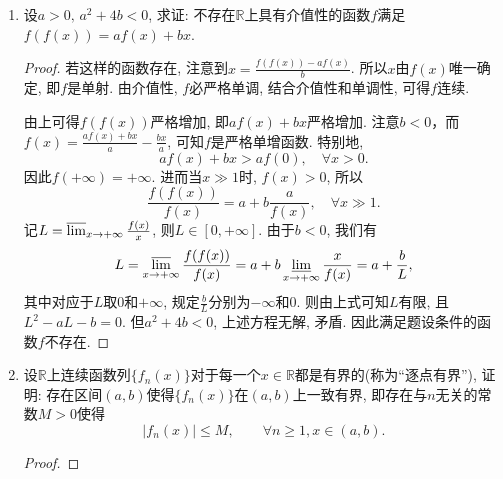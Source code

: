 \begin{3b}
\begin{enumerate}
\begin{proof}
类似地，可以找到 $k_2>k_1,[a_2, b_2] \subset[a_1, b_1]$，
满足 $0<b_2-a_2 \leqslant \frac{2}{k_2}$，使得
$$|f(x)| \geqslant \varepsilon, \quad \forall\, x \in[k_2a_2, k_2b_2].$$
一般地，依次有 $k_n>k_{n-1},[a_k, b_k] \subset[a_{k-1}, b_{k-1}]\ (n=3,4, \cdots)$，
满足 $0<b_k-a_k \leqslant \frac{2}{k_n}$，使得
$$|f(x)| \geqslant \varepsilon, \quad \forall\, x \in[k_na_n, k_nb_n].$$
由闭区间套定理，区间列 $\{[a_n, b_n]\}$ 有唯一的公共点 $\xi>0$。
因 $k_n\xi \in[k_na_n, k_nb_n]$，所以
$$|f(k_n\xi)| \geqslant \varepsilon, \quad \forall\, n \geqslant 1,$$
这与 $\lim\limits_{n \rightarrow+\infty} f(n\xi)=0$ 矛盾。
所以 $\lim\limits_{x \rightarrow+\infty} f(x)=0$。

注：从证明过程易见只要对某个区间 $(a, b) \subset(0,+\infty)$ 成立
$$\lim_{n \rightarrow+\infty} f(nx)=0, \quad \forall\, x \in(a, b),$$
便有 $\lim\limits_{x \rightarrow+\infty} f(x)=0$。
\end{proof}
\item 设\(a>0,\,a^2+4b<0\), 求证: 不存在\(\mathbb{R}\)上具有介值性的函数\(f\)满足\(f(f(x))=af(x)+bx\).
\begin{proof}
若这样的函数存在, 注意到\(x=\frac{f(f(x))-af(x)}{b}\). 
所以\(x\)由\(f(x)\)唯一确定, 即\(f\)是单射. 
由介值性, \(f\)必严格单调, 结合介值性和单调性, 可得\(f\)连续.

由上可得\(f(f(x))\)严格增加, 即\(af(x)+bx\)严格增加. 
注意\(b<0\)，而\(f(x)=\frac{af(x)+bx}{a}-\frac{bx}{a}\), 可知\(f\)是严格单增函数. 
特别地,\[af(x)+bx>af(0),\quad\forall x>0.\]因此\(f(+\infty)=+\infty\). 
进而当\(x\gg 1\)时, \(f(x)>0\), 所以
\[\frac{f(f(x))}{f(x)}=a+b\frac{a}{f(x)},\quad \forall x\gg 1.\]
记\(L=\varlimsup_{x\rightarrow+\infty}\frac{f(x)}{x}\), 则\(L\in[0,+\infty]\). 
由于\(b<0\), 我们有
\[L=\varlimsup_{x\rightarrow+\infty}\frac{f(f(x))}{f(x)}
=a+b\varliminf_{x\rightarrow+\infty}\frac{x}{f(x)}=a+\frac{b}{L},\]
其中对应于\(L\)取\(0\)和\(+\infty\), 规定\(\frac{b}{L}\)分别为\(-\infty\)和\(0\). 
则由上式可知\(L\)有限, 且\(L^2-aL-b=0\). 
但\(a^2+4b<0\), 上述方程无解, 矛盾. 因此满足题设条件的函数\(f\)不存在.
\end{proof}
\item 设\(\mathbb{R}\)上连续函数列\(\{f_n(x)\}\)对于每一个\(x\in\mathbb{R}\)都是有界的(称为“逐点有界”), 
证明: 存在区间\((a,b)\)使得\(\{f_n(x)\}\)在\((a,b)\)上一致有界, 即存在与\(n\)无关的常数\(M>0\)使得
\[|f_n(x)|\leqslant M,\qquad \forall n\geqslant 1,x\in (a,b).\]
\begin{proof}
	

\end{proof}
\end{enumerate}
\end{3b}
